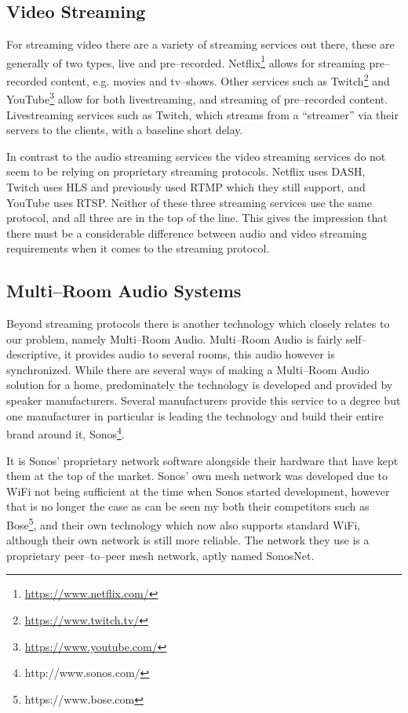 \subsection{Video Streaming}
For streaming video there are a variety of streaming services out there, these are generally of two types, live and pre--recorded.
Netflix\footnote{\url{https://www.netflix.com/}} allows for streaming pre--recorded content, e.g. movies and tv--shows.
Other services such as Twitch\footnote{\url{https://www.twitch.tv/}} and YouTube\footnote{\url{https://www.youtube.com/}} allow for both livestreaming, and streaming of pre--recorded content.
Livestreaming services such as Twitch, which streams from a ``streamer'' via their servers to the clients, with a baseline short delay.

In contrast to the audio streaming services the video streaming services do not seem to be relying on proprietary streaming protocols.
Netflix uses \ac{DASH}, Twitch uses \ac{HLS} and previously used \ac{RTMP} which they still support, and YouTube uses \ac{RTSP}.\cite{netflix}\cite{twitch}\cite{rtsp_youtube}
Neither of these three streaming services use the same protocol, and all three are in the top of the line.
This gives the impression that there must be a considerable difference between audio and video streaming requirements when it comes to the streaming protocol.

\subsection{Multi--Room Audio Systems}
Beyond streaming protocols there is another technology which closely relates to our problem, namely Multi--Room Audio.
Multi--Room Audio is fairly self--descriptive, it provides audio to several rooms, this audio however is synchronized.
While there are several ways of making a Multi--Room Audio solution for a home, predominately the technology is developed and provided by speaker manufacturers.
Several manufacturers provide this service to a degree but one manufacturer in particular is leading the technology and build their entire brand around it, Sonos\footnote{http://www.sonos.com/}.

It is Sonos' proprietary network software alongside their hardware that have kept them at the top of the market.
Sonos' own mesh network was developed due to WiFi not being sufficient at the time when Sonos started development, however that is no longer the case as can be seen my both their competitors such as Bose\footnote{https://www.bose.com}, and their own technology which now also supports standard WiFi, although their own network is still more reliable.\cite{sonos1}
The network they use is a proprietary peer--to--peer mesh network, aptly named SonosNet.\cite{sonosWiki}

